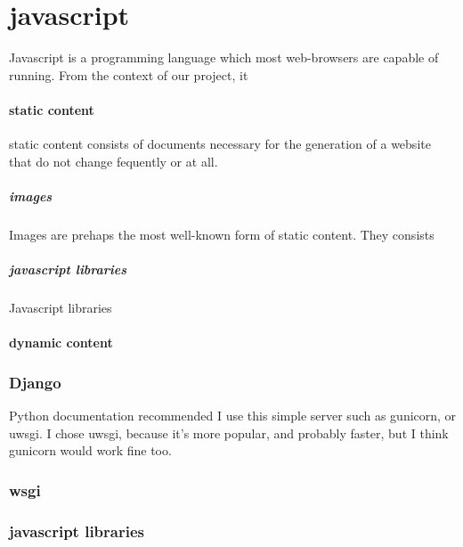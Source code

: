 \chapter{javascript}

Javascript is a programming language which most web-browsers are capable of running.  From the context of our project, it 







\subsubsection{static content}

static content consists of documents necessary for the generation of a website that do not change fequently or at all.

\paragraph{images}

Images are prehaps the most well-known form of static content.  They consists

\paragraph{javascript libraries}

Javascript libraries 

\subsubsection{dynamic content}


\subsection{Django}

Python documentation recommended I use this simple server such as gunicorn, or uwsgi.  I chose uwsgi, because it's more popular, and probably faster, but I think gunicorn would work fine too.


\subsection{wsgi}





\subsection{javascript libraries}

